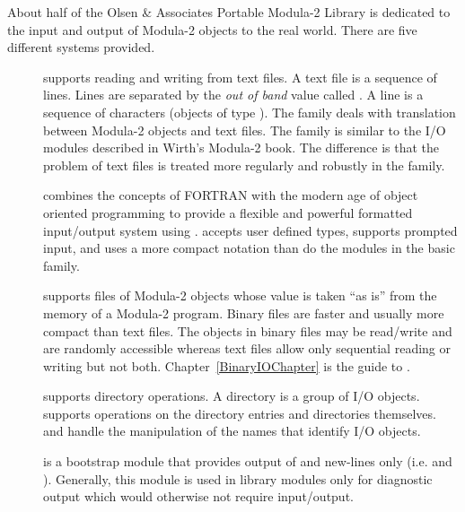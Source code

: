 About half of the Olsen \& Associates Portable Modula-2 Library
is dedicated to the input and output of
Modula-2 objects to the real world.   There are five different systems
provided.
\begin{description}
\item[]
    supports reading and writing from text files. A text file
    is a sequence of lines.  Lines are separated by the {\em out of band} 
    value called .  A line is a sequence of characters
    (objects of type ).  The  family deals
    with translation between Modula-2 objects and text files.  
    The  family is similar to the I/O modules described in
    Wirth's Modula-2 book.  The difference is that the
    problem of text files is treated more regularly and robustly
    in the  family.

\item[]
    combines the concepts of FORTRAN
    with the modern age of object
    oriented programming to provide a flexible and powerful formatted
    input/output system using .  
    accepts user defined types, supports prompted input, and uses
    a more compact notation than do the modules in the basic 
    family.

\item[]
    supports files of Modula-2 objects whose value is taken ``as is''
    from the memory of a Modula-2 program.  Binary files are faster and
    usually more compact than text files.  
    The objects in binary files may be read/write and are randomly accessible 
    whereas
    text files allow only sequential reading or writing but not both.
    Chapter~\ref{BinaryIOChapter} is the guide to .
    
\item[]
    supports directory operations.  A directory is a group of I/O objects.
     supports operations on the directory entries and
    directories themselves.   and 
    handle the manipulation of the names that identify I/O objects.
    
\item[]
    is a bootstrap module that provides output of 
    and new-lines only (i.e.  and ).
    Generally, this module is used in library modules only for diagnostic
    output which would otherwise not require input/output.

\end{description}


